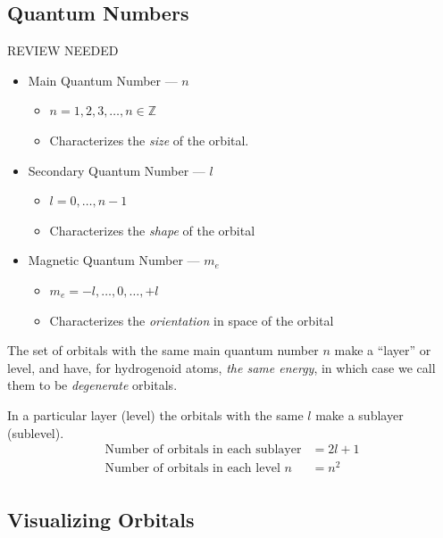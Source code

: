 \documentclass[10pt]{article}
\begin{document}
\subsection{Quantum Numbers}
REVIEW NEEDED
\begin{itemize}
	\item Main Quantum Number --- $n$
	      \begin{itemize}
	      	\item $n=1,2,3,\ldots,n\in\mathbb Z$
	      	\item Characterizes the \emph{size} of the orbital.
	      \end{itemize}
	\item Secondary Quantum Number --- $l$
	      \begin{itemize}
	      	\item $l=0,\ldots,n-1$
	      	\item Characterizes the \emph{shape} of the orbital
	      \end{itemize}
	\item Magnetic Quantum Number --- $m_e$
	      \begin{itemize}
	      	\item $m_e = -l,\ldots,0,\ldots,+l$
	      	\item Characterizes the \emph{orientation} in space of the orbital
	      \end{itemize}
\end{itemize}
The set of orbitals with the same main quantum number $n$ make a ``layer'' or
level, and have, for hydrogenoid atoms, \emph{the same energy}, in which case
we call them to be \emph{degenerate} orbitals.

In a particular layer (level) the orbitals with the same $l$ make a sublayer (sublevel).
\begin{align*}
	\text{Number of orbitals in each sublayer}  & = 2l+1 \\
	\text{Number of orbitals in each level $n$} & = n^2  \\
\end{align*}


\subsection{Visualizing Orbitals}
\end{document}
